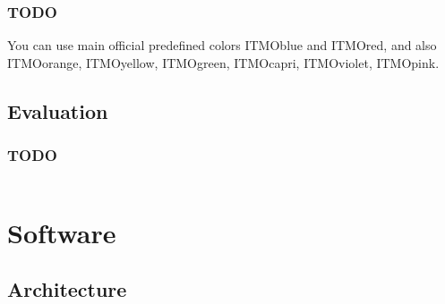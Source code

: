 \documentclass[aspectratio=169]{beamer}
\begin{document}
\begin{frame}
  \frametitle{TODO}

  You can use main official predefined colors
  \textcolor{ITMOblue}{ITMOblue} and \textcolor{ITMOred}{ITMOred}, and also
  \textcolor{ITMOorange}{ITMOorange}, \textcolor{ITMOyellow}{ITMOyellow},  \textcolor{ITMOgreen}{ITMOgreen}, \textcolor{ITMOcapri}{ITMOcapri}, \textcolor{ITMOviolet}{ITMOviolet}, \textcolor{ITMOpink}{ITMOpink}.

\end{frame}

\subsection{Evaluation}

\begin{frame}
  \frametitle{TODO}
  \begin{columns}[c]



  \end{columns}
\end{frame}

\section{Software}

\subsection{Architecture}
\end{document}
